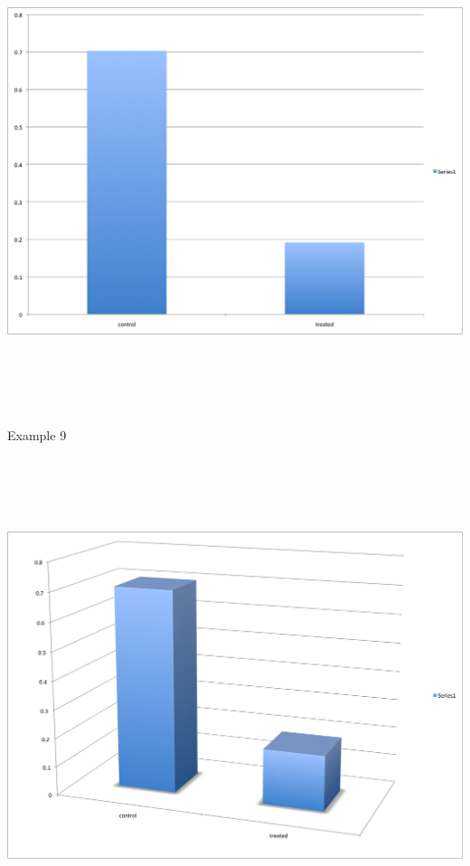 \documentclass[12pt]{article}
\newcommand{\headsize}{\fontsize{35}{35} \selectfont}
\begin{document}
\centerline{\includegraphics[height=5.5in]{Figs/fig9e.png}}


\newpage


\headsize \color{myyellow}
\hfill \begin{minipage}{5.75in}
\centering
Example 9
\end{minipage}

\vspace{30mm}

\centerline{\includegraphics[height=5.5in]{Figs/fig9f.png}}
\end{document}
